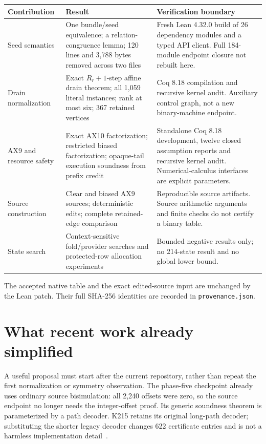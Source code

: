 \documentclass[11pt]{article}
\begin{document}
\begin{longtable}{@{}P{0.22\textwidth}P{0.37\textwidth}P{0.35\textwidth}@{}}
\toprule
Contribution & Result & Verification boundary\\
\midrule\endhead
Seed semantics & One bundle/seed equivalence; a relation-congruence lemma; 120 lines and 3,788 bytes removed across two files & Fresh Lean 4.32.0 build of 26 dependency modules and a typed API client. Full 184-module endpoint closure not rebuilt here.\\
Drain normalization & Exact $R_r+1$-step affine drain theorem; all 1,059 literal instances; rank at most six; 367 retained vertices & Coq 8.18 compilation and recursive kernel audit. Auxiliary control graph, not a new binary-machine endpoint.\\
AX9 and resource safety & Exact AX10 factorization; restricted biased factorization; opaque-tail execution soundness from prefix credit & Standalone Coq 8.18 development, twelve closed assumption reports and recursive kernel audit. Numerical-calculus interfaces are explicit parameters.\\
Source construction & Clear and biased AX9 sources; deterministic edits; complete retained-edge comparison & Reproducible source artifacts. Source arithmetic arguments and finite checks do not certify a binary table.\\
State search & Context-sensitive fold/provider searches and protected-row allocation experiments & Bounded negative results only; no 214-state result and no global lower bound.\\
\bottomrule
\end{longtable}

The accepted native table and the exact edited-source input are unchanged by the Lean patch. Their full SHA-256 identities are recorded in \texttt{provenance.json}.

\section{What recent work already simplified}

A useful proposal must start after the current repository, rather than repeat the first normalization or symmetry observation. The phase-five checkpoint already uses ordinary source bisimulation: all 2,240 offsets were zero, so the source endpoint no longer needs the integer-offset proof. Its generic soundness theorem is parameterized by a path decoder. K215 retains its original long-path decoder; substituting the shorter legacy decoder changes 622 certificate entries and is not a harmless implementation detail~\cite{phase5}.
\end{document}
